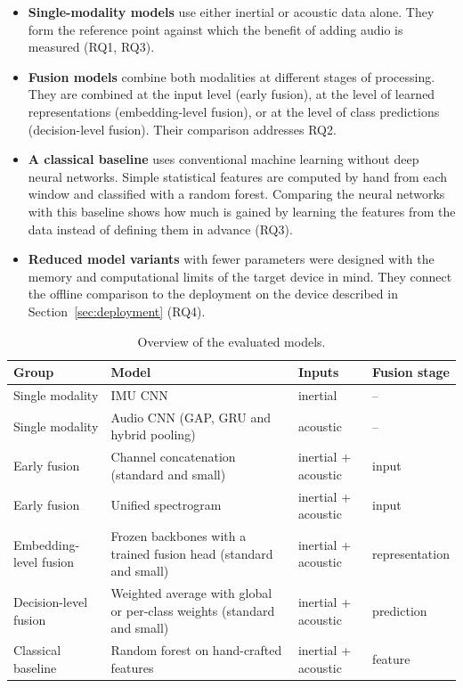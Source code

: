 \begin{itemize}
  \item \textbf{Single-modality models} use either inertial or acoustic data
  alone. They form the reference point against which the benefit of adding audio
  is measured (RQ1, RQ3).
  \item \textbf{Fusion models} combine both modalities at different stages of
  processing. They are combined at the input level (early fusion), at the level of learned
  representations (embedding-level fusion), or at the level of class predictions
  (decision-level fusion). Their comparison addresses RQ2.
  \item \textbf{A classical baseline} uses conventional machine learning without
  deep neural networks. Simple statistical features are computed by hand from
  each window and classified with a random forest. Comparing the neural networks
  with this baseline shows how much is gained by learning the features from the
  data instead of defining them in advance (RQ3).
  \item \textbf{Reduced model variants} with fewer parameters were designed with
  the memory and computational limits of the target device in mind. They connect
  the offline comparison to the deployment on the device described in
  Section~\ref{sec:deployment} (RQ4).
\end{itemize}

\begin{table}[htbp]
\centering
\small
\renewcommand{\arraystretch}{1.2}
\begin{tabularx}{\textwidth}{|p{3.1cm}|X|p{2.4cm}|p{2.6cm}|}
\hline
\textbf{Group} & \textbf{Model} & \textbf{Inputs} & \textbf{Fusion stage} \\
\hline
Single modality & IMU CNN & inertial & -- \\
Single modality & Audio CNN (GAP, GRU and hybrid pooling) & acoustic & -- \\
Early fusion & Channel concatenation (standard and small) & inertial + acoustic & input \\
Early fusion & Unified spectrogram & inertial + acoustic & input \\
Embedding-level fusion & Frozen backbones with a trained fusion head (standard and small) & inertial + acoustic & representation \\
Decision-level fusion & Weighted average with global or per-class weights (standard and small) & inertial + acoustic & prediction \\
Classical baseline & Random forest on hand-crafted features & inertial + acoustic & feature \\
\hline
\end{tabularx}
\caption{Overview of the evaluated models.}
\label{tab:model-overview}
\end{table}


